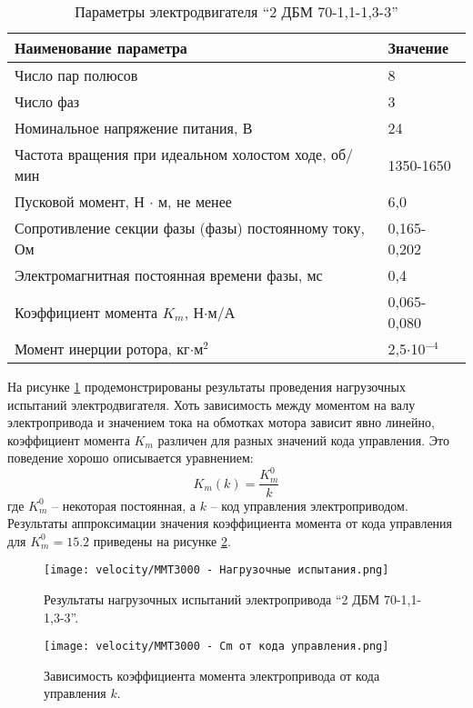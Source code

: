 \begin{table}
    \caption{Параметры электродвигателя ``2 ДБМ 70-1,1-1,3-3'' }\label{tab:mmt300_motor}
    \centering
    \begin{tabular}{ll}
        \toprule
        Наименование параметра  & Значение\\
        \midrule
        Число пар полюсов & 8 \\
        Число фаз & 3 \\
        Номинальное напряжение питания, В   & 24 \\
        Частота вращения при идеальном холостом ходе, об/мин & 1350-1650 \\
        Пусковой момент, Н $\cdot$ м, не менее      & 6,0 \\
        Сопротивление секции фазы (фазы) постоянному току, Ом & 0,165-0,202 \\
        Электромагнитная постоянная времени фазы, мс & 0,4 \\
        Коэффициент момента $K_m$, Н$\cdot$м/А   & 0,065-0,080   \\
        Момент инерции ротора, кг$\cdot$м$^2$   & 2,5$\cdot$10$^{-4}$ \\
        \bottomrule
    \end{tabular}
\end{table}
На рисунке \ref{fig:motor_load_test} продемонстрированы результаты проведения нагрузочных испытаний электродвигателя.
Хоть зависимость между моментом на валу электропривода и значением тока на обмотках мотора зависит явно линейно, коэффициент момента $K_m$ различен для разных значений кода управления.
Это поведение хорошо описывается уравнением:
\begin{equation*}
    K_m(k) = \frac{K_m^0}{k}
\end{equation*}
\noindent где $K_m^0$ -- некоторая постоянная, а $k$ -- код управления электроприводом.
Результаты аппроксимации значения коэффициента момента от кода управления для $K_m^0 = 15.2$ приведены на рисунке \ref{fig:function_cm}.

\begin{figure}[ht]
    \centering
    \texttt{[image: velocity/MMT3000 - Нагрузочные испытания.png]}
    \caption{Результаты нагрузочных испытаний электропривода ``2 ДБМ 70-1,1-1,3-3''.}
    \label{fig:motor_load_test}
\end{figure}

\begin{figure}[ht]
    \centering
    \texttt{[image: velocity/MMT3000 - Cm от кода управления.png]}
    \caption{Зависимость коэффициента момента электропривода от кода управления $k$.}
    \label{fig:function_cm}
\end{figure}

